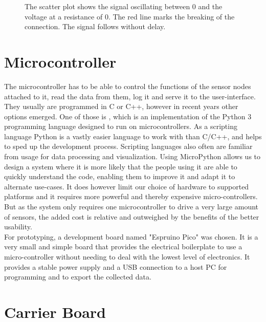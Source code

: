 \begin{figure}
	\begin{center}
		
		\caption{The scatter plot shows the signal oscillating between 0 and the voltage at a resistance of 0. The red line marks the breaking of the connection. The signal follows without delay.}
		\label{fig:swnocap}
	\end{center}
\end{figure}

\section{Microcontroller} \label{uc}

The microcontroller has to be able to control the functions of the sensor nodes attached to it, read the data from them, log it and serve it to the user-interface. They usually are programmed in C or C++, however in recent years other options emerged. One of those is \textcite{upy}, which is an implementation of the Python 3 programming language designed to run on microcontrollers. As a scripting language Python is a vastly easier language to work with than C/C++, and helps to sped up the development process. Scripting languages also often are familiar from usage for data processing and visualization. Using MicroPython allows us to design a system where it is more likely that the people using it are able to quickly understand the code, enabling them to improve it and adapt it to alternate use-cases.
It does however limit our choice of hardware to supported platforms and it requires more powerful and thereby expensive micro-controllers. But as the system only requires one microcontroller to drive a very large amount of sensors, the added cost is relative and outweighed by the benefits of the better usability.\\

For prototyping, a development board named "Espruino Pico" was chosen. It is a very small and simple board that provides the electrical boilerplate to use a micro-controller without needing to deal with the lowest level of electronics. It provides a stable power supply and a USB connection to a host PC for programming and to export the collected data.

\section{Carrier Board}

